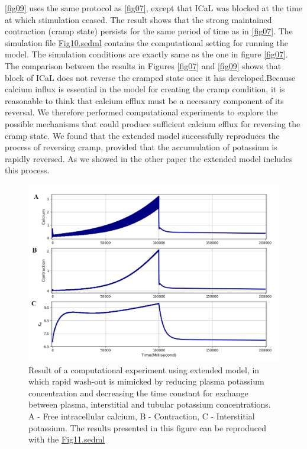 \documentclass[fleqn,10pt]{physiome}
\begin{document}
\autoref{fig09} uses the same protocol as \autoref{fig07}, except that ICaL was blocked at the time at which stimulation ceased. The result shows that the strong maintained contraction (cramp state) persists for the same period of time as in \autoref{fig07}. The simulation file \href{http://models.cellml.org/workspace/5f4/file/4071d5b4ec40c5e2b845a7a75e942df1966d2ba2/Fig10.sedml}{Fig10.sedml} contains the computational setting for running the model. The simulation conditions are exactly same as the one in figure \ref{fig07}.\newline 
The comparison between the results in Figures \ref{fig07} and \ref{fig09} shows that block of ICaL does not reverse the cramped state once it has developed.Because calcium influx is essential in the model for creating the cramp condition, it is reasonable to think that calcium efflux must be a necessary component of its reversal. We therefore performed computational experiments to explore the possible mechanisms that could produce sufficient calcium efflux for reversing the cramp state. We found that the extended model successfully reproduces the process of reversing cramp, provided that the accumulation of potassium is rapidly reversed. As we showed in the other paper \citep{Noble2019Incorporation} the extended model includes this process.\newpage
\begin{figure}[h!]
\centering
\includegraphics[width=0.9\linewidth]{figure10}
\caption{Result of a computational experiment using extended model, in which rapid wash-out is mimicked by reducing plasma potassium concentration and decreasing the time constant for exchange between plasma, interstitial and tubular potassium concentrations. A - Free intracellular calcium, B - Contraction, C - Interstitial potassium. The results presented in this figure can be reproduced with the \href{https://models.physiomeproject.org/workspace/5f4/file/26289d9227fbf4f66ca8106d8bf80ff9a51a5ac6/Fig11.sedml}{Fig11.sedml}}
\label{fig10}
\end{figure}
\end{document}
